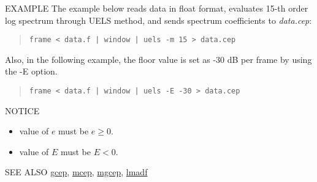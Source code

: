 \begin{qsection}{EXAMPLE}
The example below reads data in float format,
evaluates 15-th order log spectrum through UELS method,
and sends spectrum coefficients to {\em data.cep}:
\begin{quote}
 \verb!frame < data.f | window | uels -m 15 > data.cep!
\end{quote} 

Also, in the following example, the floor value is set as -30 dB per frame by using the -E option.
 \begin{quote}
 \verb!frame < data.f | window | uels -E -30 > data.cep !
 \end{quote}

\end{qsection}

\begin{qsection}{NOTICE}
\begin{itemize}
\item value of $e$ must be $e \geq 0$.
\item value of $E$ must be $E < 0$.
\end{itemize}
\end{qsection}

\begin{qsection}{SEE ALSO}
\hyperlink{gcep}{gcep},
\hyperlink{mcep}{mcep},
\hyperlink{mgcep}{mgcep},
\hyperlink{lmadf}{lmadf}
\end{qsection}
